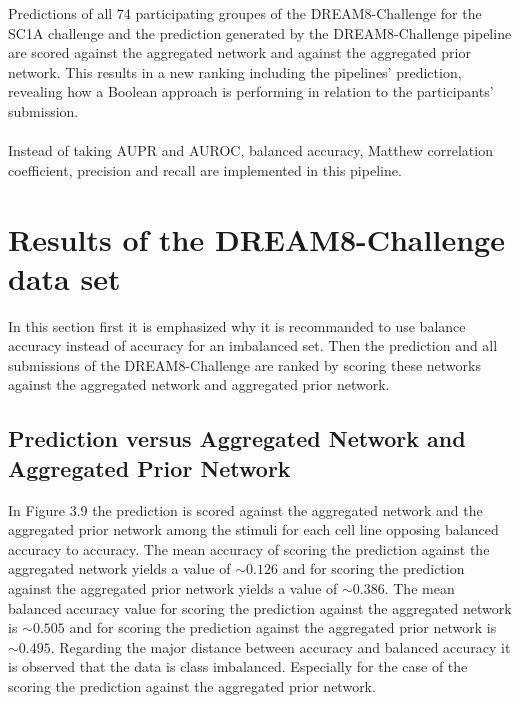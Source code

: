 Predictions of all 74 participating groupes of the DREAM8-Challenge for the SC1A challenge and the prediction generated by the DREAM8-Challenge pipeline are scored against the aggregated network and against the aggregated prior network. This results in a new ranking including the pipelines' prediction, revealing how a Boolean approach is performing in relation to the participants' submission.\\\\ 
Instead of taking AUPR and AUROC, balanced accuracy, Matthew correlation coefficient, precision and recall are implemented in this pipeline. 

\newpage
\section{Results of the DREAM8-Challenge data set}

In this section first it is emphasized why it is recommanded to use balance accuracy instead of accuracy for an imbalanced set. Then the prediction and all submissions of the DREAM8-Challenge are ranked by scoring these networks against the aggregated network and aggregated prior network. 

\subsection*{Prediction versus Aggregated Network and Aggregated Prior Network}

In Figure 3.9 the prediction is scored against the aggregated network and the aggregated prior network among the stimuli for each cell line opposing balanced accuracy to accuracy. The mean accuracy of scoring the prediction against the aggregated network yields a value of $\sim 0.126$ and for scoring the prediction against the aggregated prior network yields a value of $\sim 0.386$. The mean balanced accuracy value for scoring the prediction against the aggregated network is $\sim 0.505$ and for scoring the prediction against the aggregated prior network is $\sim 0.495$. Regarding the major distance between accuracy and balanced accuracy it is observed that the data is class imbalanced. Especially for the case of the scoring the prediction against the aggregated prior network. 

